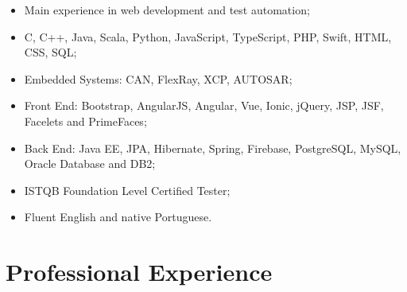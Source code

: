 \documentclass[10pt]{article}
\begin{document}
\begin{itemize}
	\item Main experience in web development and test automation;
    \item C, C++, Java, Scala, Python, JavaScript, TypeScript, PHP, Swift, HTML, CSS, SQL;
    \item Embedded Systems: CAN, FlexRay, XCP, AUTOSAR;
    \item Front End: Bootstrap, AngularJS, Angular, Vue, Ionic, jQuery, JSP, JSF, Facelets and PrimeFaces;
    \item Back End: Java EE, JPA, Hibernate, Spring, Firebase, PostgreSQL, MySQL, Oracle Database and DB2;
    \item ISTQB Foundation Level Certified Tester;
    \item Fluent English and native Portuguese.
\end{itemize}


\section*{Professional Experience}
\end{document}
